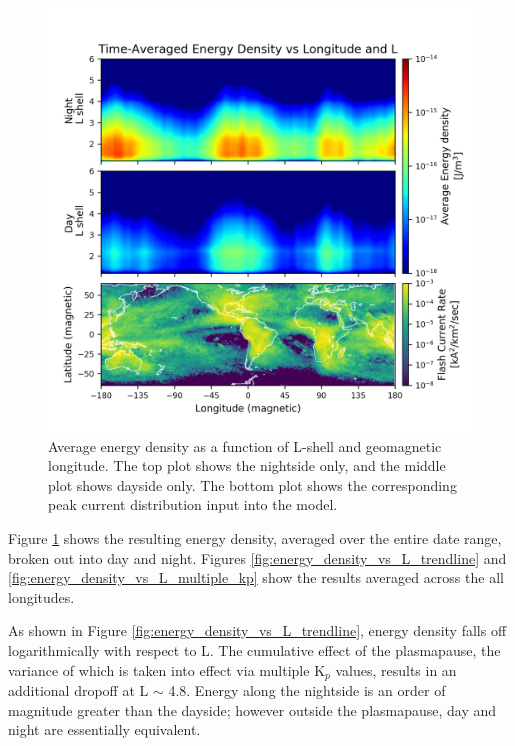 \begin{figure}[ht!]
\begin{center}
\includegraphics{figures/Energy_density_daynite.png}
\caption[Average energy density vs longitude and L]{Average energy density as a function of L-shell and geomagnetic longitude. The top plot shows the nightside only, and the middle plot shows dayside only. The bottom plot shows the corresponding peak current distribution input into the model.}
\label{fig:energy_density_daynite}
\end{center}
\end{figure}

Figure \ref{fig:energy_density_daynite} shows the resulting energy density, averaged over the entire date range, broken out into day and night. Figures \ref{fig:energy_density_vs_L_trendline} and \ref{fig:energy_density_vs_L_multiple_kp} show the results averaged across the all longitudes.

As shown in Figure \ref{fig:energy_density_vs_L_trendline}, energy density falls off logarithmically with respect to L. The cumulative effect of the plasmapause, the variance of which is taken into effect via multiple K$_p$ values, results in an additional dropoff at L $\sim$ 4.8. Energy along the nightside is an order of magnitude greater than the dayside; however outside the plasmapause, day and night are essentially equivalent.

